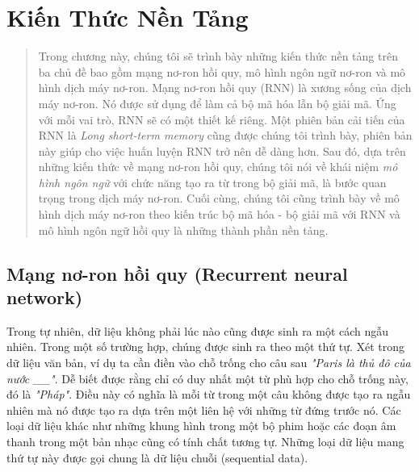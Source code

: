 \chapter{Kiến Thức Nền Tảng}
\ifpdf
    \graphicspath{{Chapter2/Chapter2Figs/PNG/}{Chapter2/Chapter2Figs/PDF/}{Chapter2/Chapter2Figs/}}
\else
    \graphicspath{{Chapter2/Chapter2Figs/EPS/}{Chapter2/Chapter2Figs/}}
\fi

\begin{quote}

Trong chương này, chúng tôi sẽ trình bày những kiến thức nền tảng trên ba chủ đề bao gồm mạng nơ-ron hồi quy, mô hình ngôn ngữ nơ-ron và mô hình dịch máy nơ-ron. Mạng nơ-ron hồi quy (RNN) là xương sống của dịch máy nơ-ron. Nó được sử dụng để làm cả bộ mã hóa lẫn bộ giải mã. Ứng với mỗi vai trò, RNN sẽ có một thiết kế riêng. Một phiên bản cải tiến của RNN là \textit{Long short-term memory} cũng được chúng tôi trình bày, phiên bản này giúp cho việc huấn luyện RNN trở nên dễ dàng hơn. Sau đó, dựa trên những kiến thức về mạng nơ-ron hồi quy, chúng tôi nói về khái niệm \textit{mô hình ngôn ngữ} với chức năng tạo ra từ trong bộ giải mã, là bước quan trọng trong dịch máy nơ-ron. Cuối cùng, chúng tôi cũng trình bày về mô hình dịch máy nơ-ron theo kiến trúc bộ mã hóa - bộ giải mã với RNN và mô hình ngôn ngữ hồi quy là những thành phần nền tảng.

\end{quote}
\section{Mạng nơ-ron hồi quy (Recurrent neural network)}

Trong tự nhiên, dữ liệu không phải lúc nào cũng được sinh ra một cách ngẫu nhiên. Trong một số trường hợp, chúng được sinh ra theo một thứ tự. Xét trong dữ liệu văn bản, ví dụ ta cần điền vào chỗ trống cho câu sau \textit{"Paris là thủ đô của nước \_\_"}. Dễ biết được rằng chỉ có duy nhất một từ phù hợp cho chỗ trống này, đó là \textit{"Pháp"}. Điều này có nghĩa là mỗi từ trong một câu không được tạo ra ngẫu nhiên mà nó được tạo ra dựa trên một liên hệ với những từ đứng trước nó. Các loại dữ liệu khác như những khung hình trong một bộ phim hoặc các đoạn âm thanh trong một bản nhạc cũng có tính chất tương tự. Những loại dữ liệu mang thứ tự này được gọi chung là dữ liệu chuỗi (sequential data).

